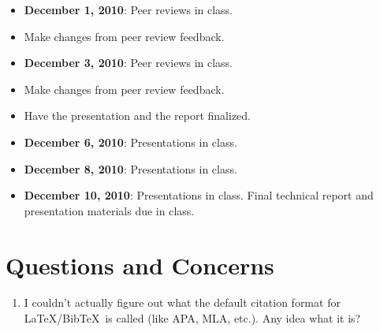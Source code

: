 \documentclass[12pt]{article}
\newcommand{\bibtex}{{\sc Bib}\TeX\ }
\begin{document}
\begin{itemize}
\item \textbf{December 1, 2010}: Peer reviews in class.
\item Make changes from peer review feedback.
\item \textbf{December 3, 2010}: Peer reviews in class.
\item Make changes from peer review feedback.
\item Have the presentation and the report finalized.
\item \textbf{December 6, 2010}: Presentations in class.
\item \textbf{December 8, 2010}: Presentations in class.
\item \textbf{December 10, 2010}: Presentations in class.  Final
technical report and presentation materials due in class.
\end{itemize}

\section{Questions and Concerns}
\label{question-section}
\begin{enumerate}
\item I couldn't actually figure out what the default citation format
for \LaTeX/\bibtex is called (like APA, MLA, etc.).  Any idea what it
is? \label{citation-question}
\end{enumerate}
\nocite{*}


\label{refs}
\end{document}
